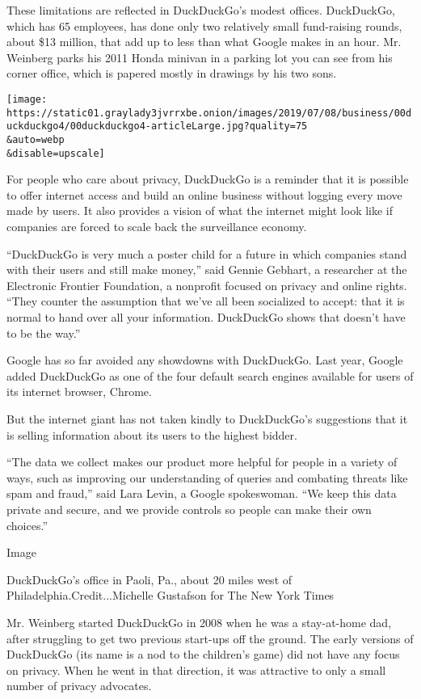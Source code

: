 These limitations are reflected in DuckDuckGo's modest offices.
DuckDuckGo, which has 65 employees, has done only two relatively small
fund-raising rounds, about \$13 million, that add up to less than what
Google makes in an hour. Mr. Weinberg parks his 2011 Honda minivan in a
parking lot you can see from his corner office, which is papered mostly
in drawings by his two sons.

\texttt{[image: https://static01.graylady3jvrrxbe.onion/images/2019/07/08/business/00duckduckgo4/00duckduckgo4-articleLarge.jpg?quality=75\\\&auto=webp\\\&disable=upscale]}

For people who care about privacy, DuckDuckGo is a reminder that it is
possible to offer internet access and build an online business without
logging every move made by users. It also provides a vision of what the
internet might look like if companies are forced to scale back the
surveillance economy.

``DuckDuckGo is very much a poster child for a future in which companies
stand with their users and still make money,'' said Gennie Gebhart, a
researcher at the Electronic Frontier Foundation, a nonprofit focused on
privacy and online rights. ``They counter the assumption that we've all
been socialized to accept: that it is normal to hand over all your
information. DuckDuckGo shows that doesn't have to be the way.''

Google has so far avoided any showdowns with DuckDuckGo. Last year,
Google added DuckDuckGo as one of the four default search engines
available for users of its internet browser, Chrome.

But the internet giant has not taken kindly to DuckDuckGo's suggestions
that it is selling information about its users to the highest bidder.

``The data we collect makes our product more helpful for people in a
variety of ways, such as improving our understanding of queries and
combating threats like spam and fraud,'' said Lara Levin, a Google
spokeswoman. ``We keep this data private and secure, and we provide
controls so people can make their own choices.''

Image

DuckDuckGo's office in Paoli, Pa., about 20 miles west of
Philadelphia.Credit...Michelle Gustafson for The New York Times

Mr. Weinberg started DuckDuckGo in 2008 when he was a stay-at-home dad,
after struggling to get two previous start-ups off the ground. The early
versions of DuckDuckGo (its name is a nod to the children's game) did
not have any focus on privacy. When he went in that direction, it was
attractive to only a small number of privacy advocates.


